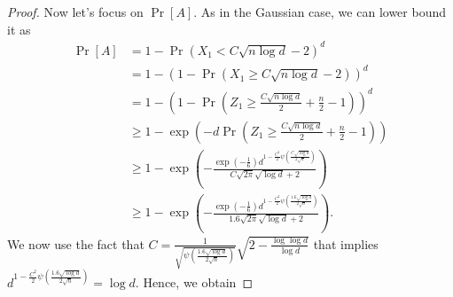 \documentclass{article}
\begin{document}
\begin{proof}
Now let's focus on $\Pr[A]$. As in the Gaussian case, we can lower bound it as
\begin{align*}
\Pr[A]
& = 1 - \Pr(X_1 < C \sqrt{n \log d}-2)^d \\
& = 1 - (1-\Pr(X_1\ge C \sqrt{n \log d}-2))^d \\
& = 1 - (1-\Pr(Z_1\ge \frac{C \sqrt{n \log d}}{2} +\frac{n}{2}-1))^d \\
& \ge 1-\exp\left(-d \Pr(Z_1\ge \frac{C \sqrt{n \log d}}{2} +\frac{n}{2}-1) \right) \\
& \ge 1 - \exp\left(-\frac{\exp\left(-\frac{1}{6}\right) d^{1-\frac{C^2}{2} \psi\left(\frac{C \sqrt{\log d}}{2 \sqrt{n}}\right)}}{C \sqrt{2\pi} \sqrt{\log d}+2}\right) \\
& \ge 1 - \exp\left(-\frac{\exp\left(-\frac{1}{6}\right) d^{1-\frac{C^2}{2} \psi\left(\frac{1.6 \sqrt{\log d}}{2 \sqrt{n}}\right)}}{1.6 \sqrt{2\pi} \sqrt{\log d}+2}\right).
%
\end{align*}
We now use the fact that $C=\frac{1}{\sqrt{\psi\left(\frac{1.6 \sqrt{\log d}}{2 \sqrt{n}}\right)}}\sqrt{2- \frac{\log \log d}{\log d}}$ that implies $d^{1-\frac{C^2}{2} \psi\left(\frac{1.6 \sqrt{\log d}}{2 \sqrt{n}}\right)}=\log d$. Hence, we obtain

\end{proof}
\end{document}
